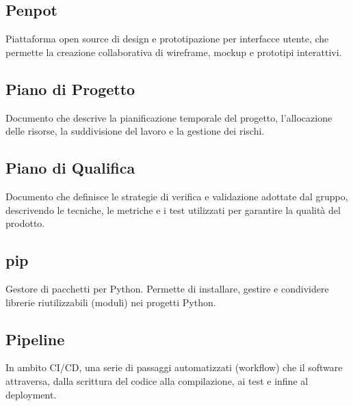 \documentclass[a4paper, 11pt, oneside]{scrartcl} %
\begin{document}
\subsection*{Penpot}
Piattaforma open source di design e prototipazione per interfacce utente, che permette la creazione collaborativa di wireframe, mockup e prototipi interattivi.
\vspace{0.5cm}

\subsection*{Piano di Progetto}


Documento che descrive la pianificazione temporale del progetto, l'allocazione delle risorse, la suddivisione del lavoro e la gestione dei rischi.

\vspace{0.5cm}

\subsection*{Piano di Qualifica}


Documento che definisce le strategie di verifica e validazione adottate dal gruppo, descrivendo le tecniche, le metriche e i test utilizzati per garantire la qualità del prodotto.

\vspace{0.5cm}

\subsection*{pip}


Gestore di pacchetti per Python. Permette di installare, gestire e condividere librerie riutilizzabili (moduli) nei progetti Python.

\vspace{0.5cm}

\subsection*{Pipeline}
In ambito CI/CD, una serie di passaggi automatizzati (workflow) che il software attraversa, dalla scrittura del codice alla compilazione, ai test e infine al deployment.
\vspace{0.5cm}
\end{document}

